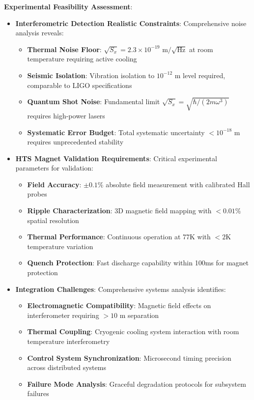 \documentclass[12pt,a4paper]{article}
\begin{document}
\textbf{Experimental Feasibility Assessment}:

\begin{itemize}
\item \textbf{Interferometric Detection Realistic Constraints}: Comprehensive noise analysis reveals:
   \begin{itemize}
   \item \textbf{Thermal Noise Floor}: $\sqrt{S_x} = 2.3 \times 10^{-19}$ m$/\sqrt{\text{Hz}}$ at room temperature requiring active cooling
   \item \textbf{Seismic Isolation}: Vibration isolation to $10^{-12}$ m level required, comparable to LIGO specifications
   \item \textbf{Quantum Shot Noise}: Fundamental limit $\sqrt{S_x} = \sqrt{\hbar/(2m\omega^3)}$ requires high-power lasers
   \item \textbf{Systematic Error Budget}: Total systematic uncertainty $< 10^{-18}$ m requires unprecedented stability
   \end{itemize}

\item \textbf{HTS Magnet Validation Requirements}: Critical experimental parameters for validation:
   \begin{itemize}
   \item \textbf{Field Accuracy}: $\pm 0.1\%$ absolute field measurement with calibrated Hall probes
   \item \textbf{Ripple Characterization}: 3D magnetic field mapping with $< 0.01\%$ spatial resolution
   \item \textbf{Thermal Performance}: Continuous operation at 77K with $< 2$K temperature variation
   \item \textbf{Quench Protection}: Fast discharge capability within 100ms for magnet protection
   \end{itemize}

\item \textbf{Integration Challenges}: Comprehensive systems analysis identifies:
   \begin{itemize}
   \item \textbf{Electromagnetic Compatibility}: Magnetic field effects on interferometer requiring $> 10$ m separation
   \item \textbf{Thermal Coupling}: Cryogenic cooling system interaction with room temperature interferometry
   \item \textbf{Control System Synchronization}: Microsecond timing precision across distributed systems
   \item \textbf{Failure Mode Analysis}: Graceful degradation protocols for subsystem failures
   \end{itemize}
\end{itemize}
\end{document}
